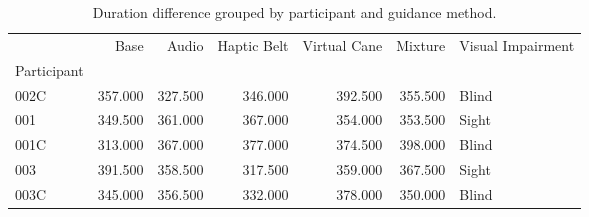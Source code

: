 
\begin{table}[!htb]
\centering
\caption{Duration difference grouped by participant and guidance method.}
\label{tab:duracao_average}
\begin{tabular}{lrrrrrl}
\toprule
{} &    Base &   Audio &  Haptic Belt &  Virtual Cane &  Mixture & Visual Impairment \\
Participant &         &         &              &               &          &                   \\
\midrule
002C        & 357.000 & 327.500 &      346.000 &       392.500 &  355.500 &             Blind \\
001         & 349.500 & 361.000 &      367.000 &       354.000 &  353.500 &             Sight \\
001C        & 313.000 & 367.000 &      377.000 &       374.500 &  398.000 &             Blind \\
003         & 391.500 & 358.500 &      317.500 &       359.000 &  367.500 &             Sight \\
003C        & 345.000 & 356.500 &      332.000 &       378.000 &  350.000 &             Blind \\
\bottomrule
\end{tabular}
\end{table}

